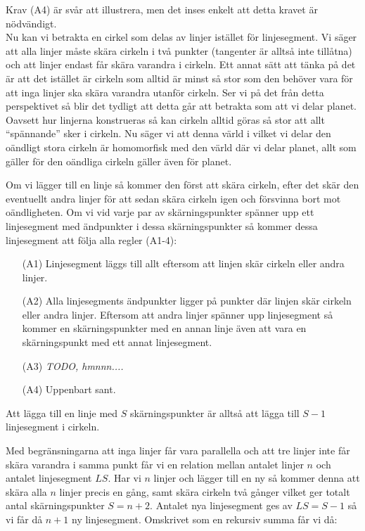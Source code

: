 \documentclass{article}
\begin{document}
Krav (A4) är svår att illustrera, men det inses enkelt att detta kravet är nödvändigt.
\\

Nu kan vi betrakta en cirkel som delas av linjer istället för linjesegment. Vi säger att alla linjer måste skära cirkeln i två punkter (tangenter är alltså inte tillåtna) och att linjer endast får skära varandra i cirkeln. Ett annat sätt att tänka på det är att det istället är cirkeln som alltid är minst så stor som den behöver vara för att inga linjer ska skära varandra utanför cirkeln. Ser vi på det från detta perspektivet så blir det tydligt att detta går att betrakta som att vi delar planet. Oavsett hur linjerna konstrueras så kan cirkeln alltid göras så stor att allt ``spännande'' sker i cirkeln. Nu säger vi att denna värld i vilket vi delar den oändligt stora cirkeln är homomorfisk med den värld där vi delar planet, allt som gäller för den oändliga cirkeln gäller även för planet.

Om vi lägger till en linje så kommer den först att skära cirkeln, efter det skär den eventuellt andra linjer för att sedan skära cirkeln igen och försvinna bort mot oändligheten. Om vi vid varje par av skärningspunkter spänner upp ett linjesegment med ändpunkter i dessa skärningspunkter så kommer dessa linjesegment att följa alla regler (A1-4):

\begin{itemize}
  \item[(A1)] Linjesegment läggs till allt eftersom att linjen skär cirkeln eller andra linjer.
  \item[(A2)] Alla linjesegments ändpunkter ligger på punkter där linjen skär cirkeln eller andra linjer. Eftersom att andra linjer spänner upp linjesegment så kommer en skärningspunkter med en annan linje även att vara en skärningspunkt med ett annat linjesegment.
  \item[(A3)] \emph{TODO, hmnnn....}
  \item[(A4)] Uppenbart sant.
\end{itemize}

Att lägga till en linje med $S$ skärningspunkter är alltså att lägga till $S - 1$ linjesegment i cirkeln.

Med begränsningarna att inga linjer får vara parallella och att tre linjer inte får skära varandra i samma punkt får vi en relation mellan antalet linjer $n$ och antalet linjesegment $LS$. Har vi $n$ linjer och lägger till en ny så kommer denna att skära alla $n$ linjer precis en gång, samt skära cirkeln två gånger vilket ger totalt antal skärningspunkter $S = n + 2$. Antalet nya linjesegment ges av $LS = S - 1$ så vi får då $n + 1$ ny linjesegment. Omskrivet som en rekursiv summa får vi då:
\end{document}
